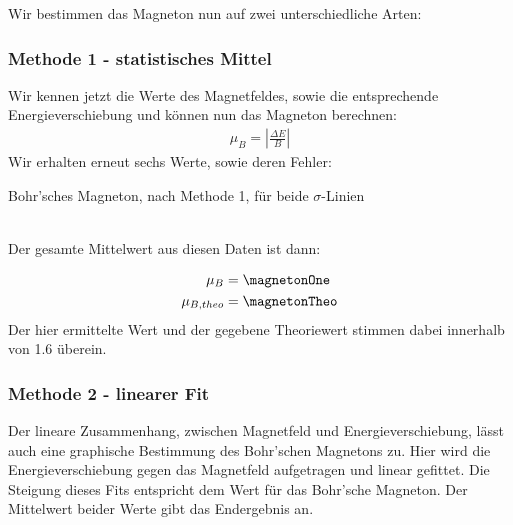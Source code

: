         Wir bestimmen das Magneton nun auf zwei unterschiedliche Arten:

        \subsubsection{Methode 1 - statistisches Mittel}
          Wir kennen jetzt die Werte des Magnetfeldes, sowie die entsprechende Energieverschiebung und können nun das Magneton berechnen:
          \begin{align}
            \mu_B=\left| \frac{\Delta E}{B} \right|
          \end{align}
          Wir erhalten erneut sechs Werte, sowie deren Fehler:
          \begin{table}[H]
            \centering
            
            \caption{Bohr'sches Magneton, nach Methode 1, für beide $\sigma$-Linien}
            \label{tab::2}
          \end{table}~\\
          Der gesamte Mittelwert aus diesen Daten ist dann:

          \begin{align}
            \mu_B         &= \magnetonOne\\
            \mu_{B, theo} &= \magnetonTheo %
          \end{align}
          Der hier ermittelte Wert und der gegebene Theoriewert stimmen dabei innerhalb von \SI{1.6}{\sigma} überein.

        \subsubsection{Methode 2 - linearer Fit}
        Der lineare Zusammenhang, zwischen Magnetfeld und Energieverschiebung, lässt auch eine graphische Bestimmung des Bohr'schen Magnetons zu. Hier wird die Energieverschiebung gegen das Magnetfeld aufgetragen und linear gefittet. Die Steigung dieses Fits entspricht dem Wert für das Bohr'sche Magneton. Der Mittelwert beider Werte gibt das Endergebnis an.

